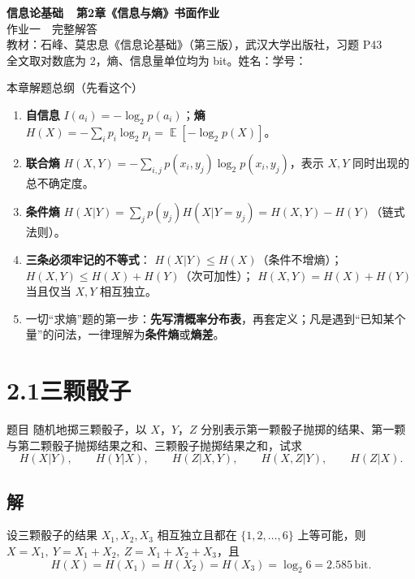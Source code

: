 \documentclass[11pt,a4paper]{ctexart}
\newcommand{\Hx}[1]{H\!\left(#1\right)}
\newcommand{\lb}{\log_{2}}
\DeclareMathOperator{\E}{\mathbb{E}}
\newcommand{\bit}{\,\text{bit}}
\begin{document}
\begin{center}
  {\LARGE\bfseries 信息论基础\ \ 第2章《信息与熵》书面作业}\\[6pt]
  {\large 作业一\ \ 完整解答}\\[10pt]
  {\small 教材：石峰、莫忠息《信息论基础》（第三版），武汉大学出版社，习题 P43}\\[4pt]
  {\small 全文取对数底为 2，熵、信息量单位均为 bit。\quad 姓名：\underline{\hspace{3cm}}\quad 学号：\underline{\hspace{3cm}}}
\end{center}

\vspace{-4pt}
\begin{keypoint}{本章解题总纲（先看这个）}
\begin{enumerate}[leftmargin=1.6em,itemsep=1pt,topsep=2pt]
  \item \textbf{自信息} $I(a_i)=-\lb p(a_i)$；\textbf{熵} $H(X)=-\sum_i p_i\lb p_i=\E[-\lb p(X)]$。
  \item \textbf{联合熵} $\Hx{X,Y}=-\sum_{i,j}p(x_i,y_j)\lb p(x_i,y_j)$，表示 $X,Y$ 同时出现的总不确定度。
  \item \textbf{条件熵} $\Hx{X|Y}=\sum_j p(y_j)\Hx{X|Y=y_j}=\Hx{X,Y}-\Hx{Y}$（链式法则）。
  \item \textbf{三条必须牢记的不等式}：
        $\Hx{X|Y}\le \Hx{X}$（条件不增熵）；
        $\Hx{X,Y}\le \Hx{X}+\Hx{Y}$（次可加性）；
        $\Hx{X,Y}=\Hx{X}+\Hx{Y}$ 当且仅当 $X,Y$ 相互独立。
  \item 一切“求熵”题的第一步：\textbf{先写清概率分布表}，再套定义；凡是遇到“已知某个量”的问法，一律理解为\textbf{条件熵}或\textbf{熵差}。
\end{enumerate}
\end{keypoint}

\section*{2.1\quad 三颗骰子}

\begin{problem}{题目}
随机地掷三颗骰子，以 $X$，$Y$，$Z$ 分别表示第一颗骰子抛掷的结果、第一颗与第二颗骰子抛掷结果之和、三颗骰子抛掷结果之和，试求
\[
\Hx{X|Y},\qquad \Hx{Y|X},\qquad \Hx{Z|X,Y},\qquad \Hx{X,Z|Y},\qquad \Hx{Z|X}.
\]
\end{problem}

\subsection*{解}
设三颗骰子的结果 $X_1,X_2,X_3$ 相互独立且都在 $\{1,2,\dots,6\}$ 上等可能，则
$X=X_1,\ Y=X_1+X_2,\ Z=X_1+X_2+X_3$，且
\[
\Hx{X}=\Hx{X_1}=\Hx{X_2}=\Hx{X_3}=\lb 6=2.585\bit.
\]
\end{document}

